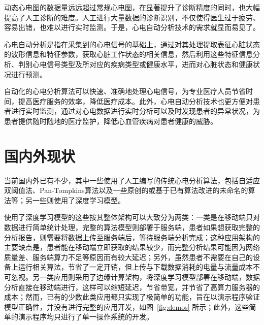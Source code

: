动态心电图的数据量远远超过常规心电图，在显著提升了诊断精度的同时，也大幅提高了人工诊断的难度。人工进行大量数据的诊断识别，不仅使得医生过于疲劳、容易出错，也难以进行实时监测。于是，心电自动分析技术的需求就显而易见了。

心电自动分析是指在采集到的心电信号的基础上，通过对其处理提取表征心脏状态的波形信息和特征参数，获取心脏工作状态的相关信息，然后利用这些特征信息分析、判别心电信号类型及所对应的疾病类型或健康水平，进而对心脏状态和健康状况进行预测\cite{jiXindianxinhaozidongfenxiguanjianjishuyanjiu2006}。

自动化的心电分析算法可以快速、准确地处理心电信号，为专业医疗人员节省时间，提高医疗服务的效率，降低医疗成本。此外，心电自动分析技术也更方便对患者进行实时监测，通过对心电数据进行实时分析可以及时发现患者的异常状况，为患者提供随时随地的医疗监护，降低心血管疾病对患者健康的威胁。


\section{国内外\app 现状}\label{sec:status}

当前国内外已有不少\app ，其中一些使用了人工编写的传统心电分析算法\cite{zhengJiyukechuandaishebeideyidongjianhuAPP2019,wuYidongxindianjiancexitongdeyanjiuyushixian2018,chenYidongxindianxinxijianhuxitongjixindianjiancesuanfadeyanjiu2018,heJiyuyidongpingtaidexindianjianceyiliaoxitongdeshixian2017,gradlRealtimeECGMonitoring2012,wenRealtimeECGTelemonitoring2008}，包括自适应双阈值法\cite{chenYidongxindianxinxijianhuxitongjixindianjiancesuanfadeyanjiu2018}、Pan-Tompkins算法\cite{gradlRealtimeECGMonitoring2012}以及一些原创的或基于已有算法改进的未命名的算法等；另一些\app 则使用了深度学习模型\cite{wangJiyushenduxuexideyidongyuanchengxindianjiancexitongshejiyushixian2020,singhSmartECGMonitoring2022,chenJiyushenduxuexidexindianfenximoxingdeshejiyuyouhua2021,liuJiyuyidongzhongduanfenxidekechuandairouxingxindianjiancexitong2021,wangEnablingSmartPersonalized2014,jinPredictingCardiovascularDisease2009}。

使用了深度学习模型的这些\app 按其整体架构可以大致分为两类：一类是在移动端只对数据进行简单统计处理，完整的算法模型则部署于服务端\cite{wangJiyushenduxuexideyidongyuanchengxindianjiancexitongshejiyushixian2020,singhSmartECGMonitoring2022}，患者如果想获取完整的分析报告，则需要将数据上传至服务端后，等待服务端分析完成；这种应用架构的主要缺点是，患者能在移动端立即获取的结果较少，而完整分析结果可能因为网络质量差、服务端算力不足等原因而有较大延迟；另外，虽然患者不需要在自己的设备上运行相关算法，节省了一定开销，但上传与下载数据消耗的电量与流量成本不可忽视。另一类应用则采用了边缘计算架构，将深度学习模型部署在移动端，数据分析直接在移动端进行\cite{chenJiyushenduxuexidexindianfenximoxingdeshejiyuyouhua2021,liuJiyuyidongzhongduanfenxidekechuandairouxingxindianjiancexitong2021,wangEnablingSmartPersonalized2014,jinPredictingCardiovascularDisease2009}，这样可以缩短延迟，节省带宽，并节省了高算力服务器的成本；然而，已有的少数此类应用都只实现了极简单的功能，旨在以演示程序验证模型正确性，并没有进行完整的应用开发，如图~\ref{fig:demos} 所示；此外，这些简单的演示程序均只进行了单一操作系统的开发。


